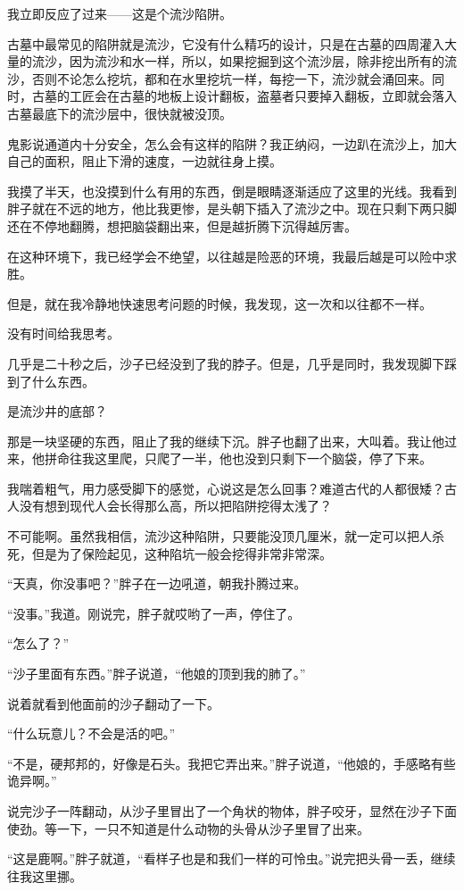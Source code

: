 我立即反应了过来——这是个流沙陷阱。

古墓中最常见的陷阱就是流沙，它没有什么精巧的设计，只是在古墓的四周灌入大量的流沙，因为流沙和水一样，所以，如果挖掘到这个流沙层，除非挖出所有的流沙，否则不论怎么挖坑，都和在水里挖坑一样，每挖一下，流沙就会涌回来。同时，古墓的工匠会在古墓的地板上设计翻板，盗墓者只要掉入翻板，立即就会落入古墓最底下的流沙层中，很快就被没顶。

鬼影说通道内十分安全，怎么会有这样的陷阱？我正纳闷，一边趴在流沙上，加大自己的面积，阻止下滑的速度，一边就往身上摸。

我摸了半天，也没摸到什么有用的东西，倒是眼睛逐渐适应了这里的光线。我看到胖子就在不远的地方，他比我更惨，是头朝下插入了流沙之中。现在只剩下两只脚还在不停地翻腾，想把脑袋翻出来，但是越折腾下沉得越厉害。

在这种环境下，我已经学会不绝望，以往越是险恶的环境，我最后越是可以险中求胜。

但是，就在我冷静地快速思考问题的时候，我发现，这一次和以往都不一样。

没有时间给我思考。

几乎是二十秒之后，沙子已经没到了我的脖子。但是，几乎是同时，我发现脚下踩到了什么东西。

是流沙井的底部？

那是一块坚硬的东西，阻止了我的继续下沉。胖子也翻了出来，大叫着。我让他过来，他拼命往我这里爬，只爬了一半，他也没到只剩下一个脑袋，停了下来。

我喘着粗气，用力感受脚下的感觉，心说这是怎么回事？难道古代的人都很矮？古人没有想到现代人会长得那么高，所以把陷阱挖得太浅了？

不可能啊。虽然我相信，流沙这种陷阱，只要能没顶几厘米，就一定可以把人杀死，但是为了保险起见，这种陷坑一般会挖得非常非常深。

“天真，你没事吧？”胖子在一边吼道，朝我扑腾过来。

“没事。”我道。刚说完，胖子就哎哟了一声，停住了。

“怎么了？”

“沙子里面有东西。”胖子说道，“他娘的顶到我的肺了。”

说着就看到他面前的沙子翻动了一下。

“什么玩意儿？不会是活的吧。”

“不是，硬邦邦的，好像是石头。我把它弄出来。”胖子说道，“他娘的，手感略有些诡异啊。”

说完沙子一阵翻动，从沙子里冒出了一个角状的物体，胖子咬牙，显然在沙子下面使劲。等一下，一只不知道是什么动物的头骨从沙子里冒了出来。

“这是鹿啊。”胖子就道，“看样子也是和我们一样的可怜虫。”说完把头骨一丢，继续往我这里挪。

